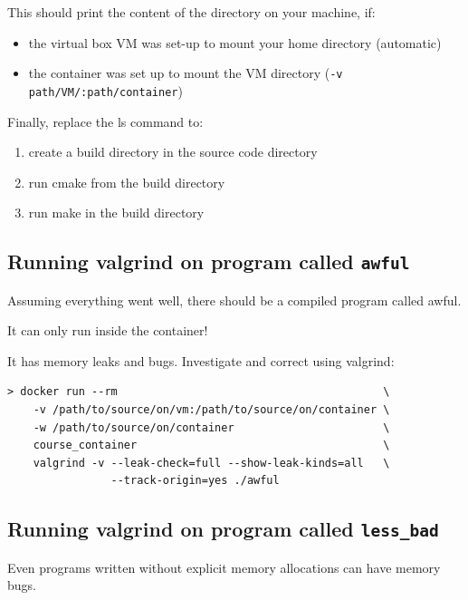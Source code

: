 This should print the content of the directory on your machine, if:

\begin{itemize}
\itemsep1pt\parskip0pt
\item
  the virtual box VM was set-up to mount your home directory (automatic)
\item
  the container was set up to mount the VM directory
  (\texttt{-v path/VM/:path/container})
\end{itemize}

Finally, replace the ls command to:

\begin{enumerate}
\def\labelenumi{\arabic{enumi}.}
\itemsep1pt\parskip0pt
\item
  create a build directory in the source code directory
\item
  run cmake from the build directory
\item
  run make in the build directory
\end{enumerate}

\subsection{Running valgrind on program called
\texttt{awful}}\label{running-valgrind-on-program-called-awful}

Assuming everything went well, there should be a compiled program called
awful.

It can only run inside the container!

It has memory leaks and bugs. Investigate and correct using valgrind:

\begin{verbatim}
> docker run --rm                                         \
    -v /path/to/source/on/vm:/path/to/source/on/container \
    -w /path/to/source/on/container                       \
    course_container                                      \
    valgrind -v --leak-check=full --show-leak-kinds=all   \
                --track-origin=yes ./awful
\end{verbatim}

\subsection{Running valgrind on program called
\texttt{less\_bad}}\label{running-valgrind-on-program-called-lessux5fbad}

Even programs written without explicit memory allocations can have
memory bugs.

